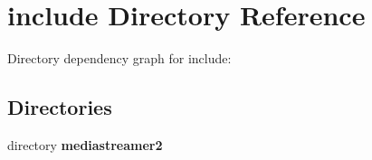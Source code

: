 \section{include Directory Reference}
\label{dir_d44c64559bbebec7f509842c48db8b23}
Directory dependency graph for include\-:
\subsection*{Directories}
\begin{DoxyCompactItemize}
\item 
directory {\bf mediastreamer2}
\end{DoxyCompactItemize}
